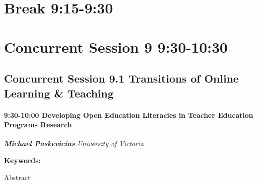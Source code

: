 \documentclass[
]{book}
\begin{document}
\hypertarget{break-915-930-1}{%
\section*{Break \textbar{} 9:15-9:30}\label{break-915-930-1}}

\hypertarget{concurrent-session-9-930-1030}{%
\section*{Concurrent Session 9 \textbar{} 9:30-10:30}\label{concurrent-session-9-930-1030}}

\hypertarget{concurrent-session-9.1-transitions-of-online-learning-teaching}{%
\subsection*{Concurrent Session 9.1 \textbar{} Transitions of Online Learning \& Teaching}\label{concurrent-session-9.1-transitions-of-online-learning-teaching}}

\begin{session}
\hypertarget{developing-open-education-literacies-in-teacher-education-programs-research}{%
\paragraph*{\texorpdfstring{9:30-10:00 \textbar{} \textbf{Developing
Open Education Literacies in Teacher Education Programs} \textbar{}
Research}{9:30-10:00 \textbar{} Developing Open Education Literacies in Teacher Education Programs \textbar{} Research}}\label{developing-open-education-literacies-in-teacher-education-programs-research}}

\textbf{\emph{Michael Paskevicius}} \textbar{} \emph{University of
Victoria}

\textbf{Keywords:}

Abstract
\end{session}
\end{document}
